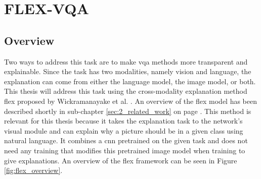 \label{sec:3_methodology}

    \section{FLEX-VQA}
    \label{sec3:flex_vqa}
        \subsection{Overview}

        Two ways to address this task are to make \gls{vqa} methods more transparent and explainable. Since the task has two modalities, namely vision and language, the explanation can come from either the language model, the image model, or both. This thesis will address this task using the cross-modality explanation method \gls{flex} proposed by Wickramanayake et al. \cite{wickramanayakeFLEXFaithfulLinguistic2019}. An overview of the \gls{flex} model has been described shortly in sub-chapter \ref{sec:2_related_work} on page \pageref{sec:2_related_work}. This method is relevant for this thesis because it takes the explanation task to the network's visual module and can explain why a picture should be in a given class using natural language. It combines a \gls{cnn} pretrained on the given task and does not need any training that modifies this pretrained image model when training to give explanations. An overview of the \gls{flex} framework can be seen in Figure \ref{fig:flex_overview}.

